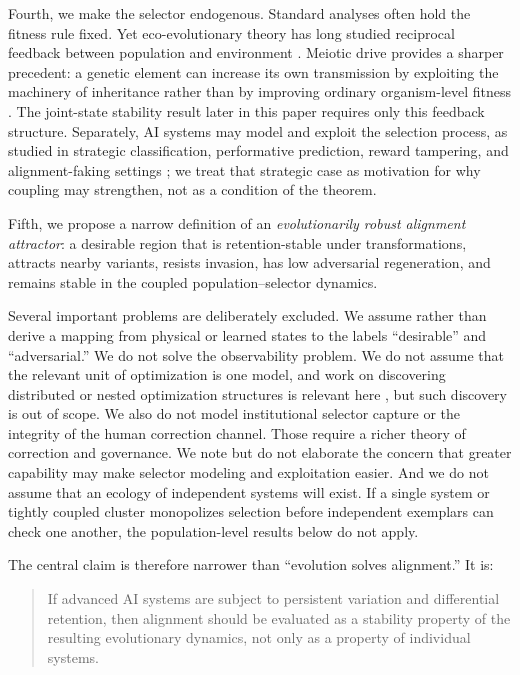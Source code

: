 \documentclass[11pt]{article}
\begin{document}
Fourth, we make the selector endogenous. Standard analyses often hold the fitness rule fixed. Yet eco-evolutionary theory has long studied reciprocal feedback between population and environment \parencite{govaert2019,ashby2019}. Meiotic drive provides a sharper precedent: a genetic element can increase its own transmission by exploiting the machinery of inheritance rather than by improving ordinary organism-level fitness \parencite{tao2007a,tao2007b,courret2019}. The joint-state stability result later in this paper requires only this feedback structure. Separately, AI systems may model and exploit the selection process, as studied in strategic classification, performative prediction, reward tampering, and alignment-faking settings \parencite{hardt2016,perdomo2020,everitt2019,greenblatt2024}; we treat that strategic case as motivation for why coupling may strengthen, not as a condition of the theorem.

Fifth, we propose a narrow definition of an \emph{evolutionarily robust alignment attractor}: a desirable region that is retention-stable under transformations, attracts nearby variants, resists invasion, has low adversarial regeneration, and remains stable in the coupled population--selector dynamics.

Several important problems are deliberately excluded. We assume rather than derive a mapping from physical or learned states to the labels ``desirable'' and ``adversarial.'' We do not solve the observability problem. We do not assume that the relevant unit of optimization is one model, and work on discovering distributed or nested optimization structures is relevant here \parencite{zarncke2025uad,kulveit2025pando}, but such discovery is out of scope. We also do not model institutional selector capture or the integrity of the human correction channel. Those require a richer theory of correction and governance. We note but do not elaborate the concern that greater capability may make selector modeling and exploitation easier. And we do not assume that an ecology of independent systems will exist. If a single system or tightly coupled cluster monopolizes selection before independent exemplars can check one another, the population-level results below do not apply.

The central claim is therefore narrower than ``evolution solves alignment.'' It is:

\begin{quote}
If advanced AI systems are subject to persistent variation and differential retention, then alignment should be evaluated as a stability property of the resulting evolutionary dynamics, not only as a property of individual systems.
\end{quote}
\end{document}
